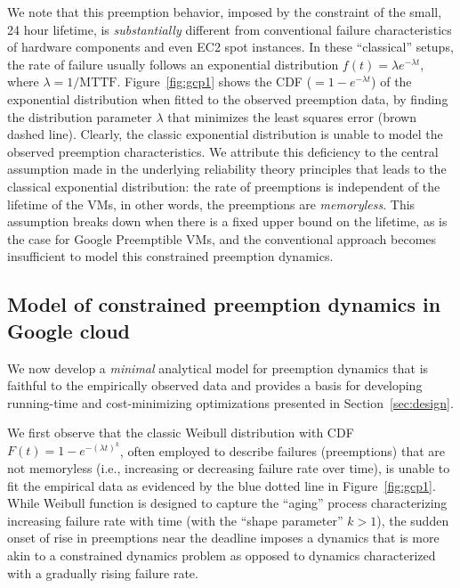 We note that this preemption behavior, imposed by the constraint of the small, 24 hour  lifetime, is \emph{substantially} different from conventional failure characteristics of hardware components and even EC2 spot instances.
In these ``classical'' setups, the rate of failure  usually follows an exponential distribution $f(t) = \lambda e^{-\lambda t}$, where $\lambda=1/\text{MTTF}$.
Figure~\ref{fig:gcp1} shows the CDF ($=1-e^{-\lambda t}$) of the exponential distribution when fitted to the observed preemption data, by finding the distribution parameter $\lambda$ that minimizes the least squares error (brown dashed line).
Clearly, the classic exponential distribution is unable to model the observed preemption characteristics.
We attribute this deficiency to the central assumption made in the underlying reliability theory principles that leads to the classical exponential distribution: the rate of preemptions is independent of the lifetime of the VMs, in other words, the preemptions are \emph{memoryless}.
This assumption breaks down when there is a fixed upper bound on the lifetime, as is the case for Google Preemptible VMs, and the conventional approach becomes insufficient to model this constrained preemption dynamics. 

\subsection{Model of constrained preemption dynamics in Google cloud}
\label{subsec:analytical-model}

We now develop a \emph{minimal} analytical model for preemption dynamics that is faithful to the empirically observed data and provides a basis for developing running-time and cost-minimizing optimizations presented in Section~\ref{sec:design}. 

We first observe that the classic Weibull distribution with CDF $F(t)=1-e^{-(\lambda t)^k}$, often employed to describe failures (preemptions) that are not memoryless (i.e., increasing or decreasing failure rate over time), is unable to fit the empirical data as evidenced by the blue dotted line in Figure~\ref{fig:gcp1}. While Weibull function is designed to capture the ``aging'' process characterizing increasing failure rate with time (with the ``shape parameter'' $k>1$), the sudden onset of rise in preemptions near the deadline imposes a dynamics that is more akin to a constrained dynamics problem as opposed to dynamics characterized with a gradually rising failure rate.

